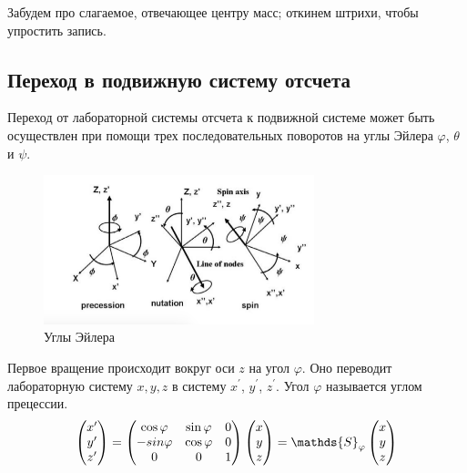 \documentclass[12pt]{article}
\newcommand{\bbS}{\mathds{S}}
\begin{document}
Забудем про слагаемое, отвечающее центру масс; откинем штрихи, чтобы упростить запись.

\subsection{Переход в подвижную систему отсчета}

Переход от лабораторной системы отсчета к подвижной системе может быть осуществлен при помощи трех последовательных поворотов на углы Эйлера $\varphi$, $\theta$ и $\psi$. 

\begin{figure}
  \centering
	\includegraphics[width=0.7\textwidth]{pictures/EulerAngles.jpg}
	\caption{Углы Эйлера}
	\label{fig:EulerAngles}
\end{figure}

Первое вращение происходит вокруг оси $z$ на угол $\varphi$. Оно переводит лабораторную систему $x, y, z$ в систему $x^\prime$, $y^\prime$, $z^\prime$. Угол $\varphi$ называется углом прецессии.
\begin{gather}
\begin{pmatrix}
x^\prime \\
y^\prime \\
z^\prime
\end{pmatrix} = 
\begin{pmatrix}
\cos \varphi & \sin \varphi & 0 \\
- sin \varphi & \cos \varphi & 0 \\
0 & 0 & 1
\end{pmatrix}
\begin{pmatrix}
x \\
y \\
z
\end{pmatrix} =
\bbS_\varphi
\begin{pmatrix}
x \\
y \\
z
\end{pmatrix} \notag
\end{gather}
\end{document}
